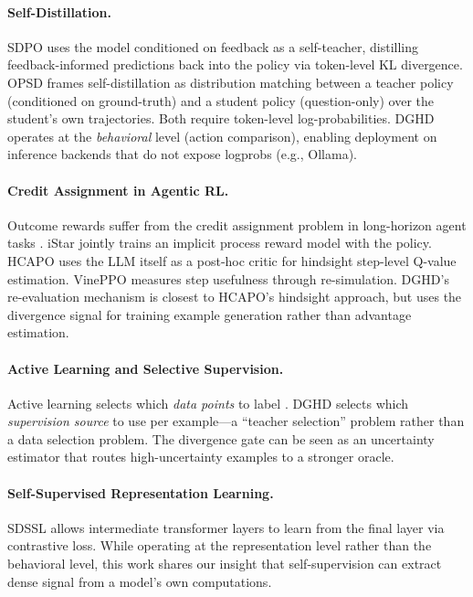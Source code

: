 \documentclass[11pt]{article}
\newcommand{\ours}{DGHD}
\begin{document}
\paragraph{Self-Distillation.}
SDPO \citep{sdpo2026} uses the model conditioned on feedback as a self-teacher, distilling feedback-informed predictions back into the policy via token-level KL divergence. OPSD \citep{opsd2026} frames self-distillation as distribution matching between a teacher policy (conditioned on ground-truth) and a student policy (question-only) over the student's own trajectories. Both require token-level log-probabilities. \ours{} operates at the \emph{behavioral} level (action comparison), enabling deployment on inference backends that do not expose logprobs (e.g., Ollama).

\paragraph{Credit Assignment in Agentic RL.}
Outcome rewards suffer from the credit assignment problem in long-horizon agent tasks \citep{istar2026, hcapo2026}. iStar \citep{istar2026} jointly trains an implicit process reward model with the policy. HCAPO \citep{hcapo2026} uses the LLM itself as a post-hoc critic for hindsight step-level Q-value estimation. VinePPO \citep{vineppo2025} measures step usefulness through re-simulation. \ours{}'s re-evaluation mechanism is closest to HCAPO's hindsight approach, but uses the divergence signal for training example generation rather than advantage estimation.

\paragraph{Active Learning and Selective Supervision.}
Active learning selects which \emph{data points} to label \citep{settles2009active}. \ours{} selects which \emph{supervision source} to use per example---a ``teacher selection'' problem rather than a data selection problem. The divergence gate can be seen as an uncertainty estimator that routes high-uncertainty examples to a stronger oracle.

\paragraph{Self-Supervised Representation Learning.}
SDSSL \citep{sdssl2023} allows intermediate transformer layers to learn from the final layer via contrastive loss. While operating at the representation level rather than the behavioral level, this work shares our insight that self-supervision can extract dense signal from a model's own computations.
\end{document}
